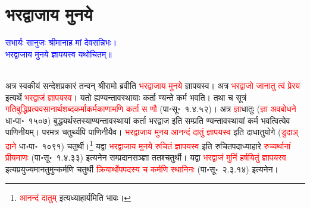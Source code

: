 \section[भरद्वाजाय मुनये]{भरद्वाजाय मुनये}
\centering\textcolor{blue}{सभार्यः सानुजः श्रीमानाह मां देवसन्निभः।\nopagebreak\\
भरद्वाजाय मुनये ज्ञापयस्व यथोचितम्॥}\nopagebreak\\
\\
\begin{sloppypar}\justifying\noindent\hspace{10mm} अत्र स्वकीयं सन्देश\-प्रकारं तन्वन् श्रीरामो ब्रवीति \textcolor{red}{भरद्वाजाय मुनये} ज्ञापयस्व। अत्र \textcolor{red}{भरद्वाजो जानातु त्वं प्रेरय} इत्यर्थे \textcolor{red}{भरद्वाजं ज्ञापयस्व}। यतो ह्यण्यन्तावस्थायाः कर्ता ण्यन्ते कर्म भवति। तथा च सूत्रं \textcolor{red}{गति\-बुद्धि\-प्रत्यवसानार्थ\-शब्दकर्माकर्मकाणामणि कर्ता स णौ} (पा॰सू॰~१.४.५२)। अत्र \textcolor{red}{ज्ञा}\-धातुः (\textcolor{red}{ज्ञा अवबोधने} धा॰पा॰~१५०७) बुद्ध्यर्थस्तस्याण्यन्तावस्थायां कर्ता भरद्वाज इति सम्प्रति ण्यन्तावस्थायां कर्म भवत्वित्येव पाणिनीयम्। परमत्र चतुर्थ्यपि पाणिनीयैव। \textcolor{red}{भरद्वाजाय मुनय आनन्दं दातुं ज्ञापयस्व} इति दा\-धातु\-योगे (\textcolor{red}{डुदाञ् दाने} धा॰पा॰~१०९१) चतुर्थी।\footnote{\textcolor{red}{आनन्दं दातुम्} इत्यध्याहार्यमिति भावः।} यद्वा \textcolor{red}{भरद्वाजाय मुनये रुचितं ज्ञापयस्व} इति रुचित\-पदाध्याहारे \textcolor{red}{रुच्यर्थानां प्रीयमाणः} (पा॰सू॰~१.४.३३) इत्यनेन सम्प्रदान\-सञ्ज्ञा ततश्चतुर्थी। यद्वा \textcolor{red}{भरद्वाजं मुनिं हर्षयितुं ज्ञापयस्व} इत्यप्रयुज्यमान\-तुमुन्\-कर्मणि चतुर्थी \textcolor{red}{क्रियार्थोपपदस्य च कर्मणि स्थानिनः} (पा॰सू॰~२.३.१४) इत्यनेन।\end{sloppypar}
